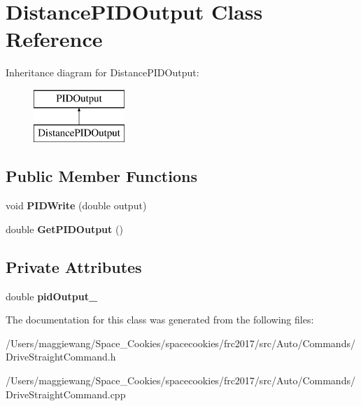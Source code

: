 \hypertarget{class_distance_p_i_d_output}{}\section{Distance\+P\+I\+D\+Output Class Reference}
\label{class_distance_p_i_d_output}
Inheritance diagram for Distance\+P\+I\+D\+Output\+:\begin{figure}[H]
\begin{center}
\leavevmode
\includegraphics[height=2.000000cm]{class_distance_p_i_d_output}
\end{center}
\end{figure}
\subsection*{Public Member Functions}
\begin{DoxyCompactItemize}
\item 
\mbox{\label{class_distance_p_i_d_output_abb33d2e1fc125644341d840c1b742102}} 
void {\bfseries P\+I\+D\+Write} (double output)
\item 
\mbox{\label{class_distance_p_i_d_output_a0c391cfc3f7d9435eef3e325e8eb60ec}} 
double {\bfseries Get\+P\+I\+D\+Output} ()
\end{DoxyCompactItemize}
\subsection*{Private Attributes}
\begin{DoxyCompactItemize}
\item 
\mbox{\label{class_distance_p_i_d_output_a1702f9370542e768153841bdc837495a}} 
double {\bfseries pid\+Output\+\_\+}
\end{DoxyCompactItemize}


The documentation for this class was generated from the following files\+:\begin{DoxyCompactItemize}
\item 
/\+Users/maggiewang/\+Space\+\_\+\+Cookies/spacecookies/frc2017/src/\+Auto/\+Commands/Drive\+Straight\+Command.\+h\item 
/\+Users/maggiewang/\+Space\+\_\+\+Cookies/spacecookies/frc2017/src/\+Auto/\+Commands/Drive\+Straight\+Command.\+cpp\end{DoxyCompactItemize}
